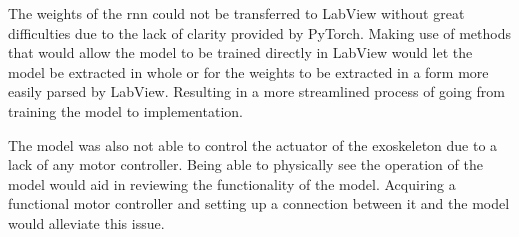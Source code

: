 The weights of the \acrshort{rnn} could not be transferred to LabView without great difficulties due to the lack of clarity provided by
PyTorch. Making use of methods that would allow the model to be trained directly in LabView would let the model be extracted in whole or 
for the weights to be extracted in a form more easily parsed by LabView. Resulting in a more streamlined process of going from training 
the model to implementation.

The model was also not able to control the actuator of the exoskeleton due to a lack of any motor controller. Being able to 
physically see the operation of the model would aid in reviewing the functionality of the model. Acquiring a functional motor 
controller and setting up a connection between it and the model would alleviate this issue.